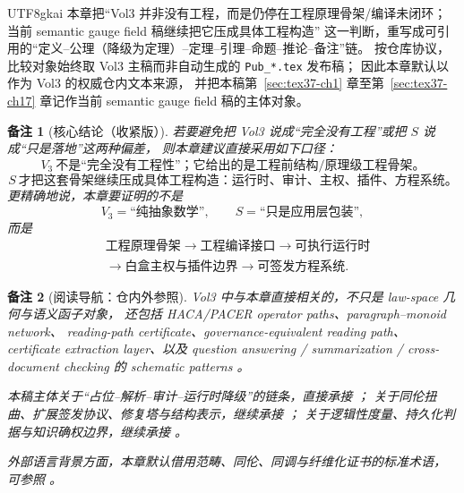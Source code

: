 \documentclass[12pt]{article}
\newtheorem{remark}{备注}[section]
\begin{document}
\begin{CJK*}{UTF8}{gkai}
本章把“Vol3 并非没有工程，而是仍停在工程原理骨架/编译未闭环；当前 semantic gauge field 稿继续把它压成具体工程构造”
这一判断，重写成可引用的“定义--公理（降级为定理）--定理--引理--命题--推论--备注”链。
按仓库协议，比较对象始终取 Vol3 主稿而非自动生成的 \texttt{Pub\_*.tex} 发布稿；
因此本章默认以
\cite{GaoZhengAppVol3}
作为 Vol3 的权威仓内文本来源，
并把本稿第~\ref{sec:tex37-ch1} 章至第~\ref{sec:tex37-ch17} 章记作当前 semantic gauge field 稿的主体对象。

\begin{remark}[核心结论（收紧版）]
\label{rem:tex37-ch18-core}
若要避免把 Vol3 说成“完全没有工程”或把 $S$ 说成“只是落地”这两种偏差，
则本章建议直接采用如下口径：
\[
  \boxed{
    V_3\ \text{不是“完全没有工程性”；它给出的是工程前结构/原理级工程骨架。}
  }
\]
\[
  \boxed{
    S\ \text{才把这套骨架继续压成具体工程构造：运行时、审计、主权、插件、方程系统。}
  }
\]
更精确地说，本章要证明的不是
\[
  V_3=\text{“纯抽象数学”},
  \qquad
  S=\text{“只是应用层包装”},
\]
而是
\[
  \begin{aligned}
    &\text{工程原理骨架}
    \to
    \text{工程编译接口}
    \to
    \text{可执行运行时}\\
    &\to
    \text{白盒主权与插件边界}
    \to
    \text{可签发方程系统}.
  \end{aligned}
\]
\end{remark}

\begin{remark}[阅读导航：仓内外参照]
\label{rem:tex37-ch18-navigation}
Vol3 中与本章直接相关的，不只是 law-space 几何与语义函子对象，
还包括 HACA/PACER operator paths、paragraph--monoid network、
reading-path certificate、governance-equivalent reading path、
certificate extraction layer、以及 question answering / summarization /
cross-document checking 的 schematic patterns \cite{GaoZhengAppVol3,GaoZheng2025GFramework}。

本稿主体关于“占位--解析--审计--运行时降级”的链条，直接承接
\cite{RepoTex20SemanticGaugeNormalization,RepoTex21AuditedWrapper,RepoTex23SemanticBase}；
关于同伦扭曲、扩展签发协议、修复塔与结构表示，继续承接
\cite{RepoTex35ExtendedCertificationTower,RepoTex36HomotopyTwistBijection}；
关于逻辑性度量、持久化判据与知识确权边界，继续承接
\cite{GaoZheng2025GFramework,RepoTex23PriorityGovernance}。

外部语言背景方面，本章默认借用范畴、同伦、同调与纤维化证书的标准术语，
可参照
\cite{MacLane1998Categories,Hatcher2002AT,Weibel1994HomologicalAlgebra,KobayashiNomizu1963Foundations}。
\end{remark}


\end{CJK*}
\end{document}
